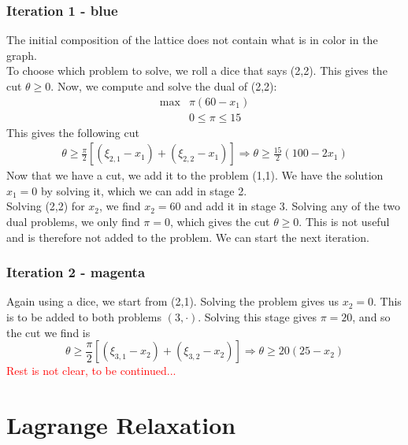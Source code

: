 \documentclass[12pt, openany]{report}
\theoremstyle{definition}
\begin{document}
\subsection{Iteration 1 - blue}
The initial composition of the lattice does not contain what is in color in the graph.\\
To choose which problem to solve, we roll a dice that says (2,2). This gives the cut $\theta\ge 0$. Now, we compute and solve the dual of (2,2):
\begin{equation}
	\begin{aligned}
		\max& \pi(60-x_1)\\
		&0\le \pi \le 15
	\end{aligned}
\end{equation}
This gives the following cut 
\begin{equation}
	\begin{aligned}
		\theta \ge \frac{\pi}{2}[(\xi_{2,1}-x_1)+(\xi_{2,2}-x_1)] \Longrightarrow \theta \ge \frac{15}{2}(100-2x_1)
	\end{aligned}
\end{equation}
Now that we have a cut, we add it to the problem (1,1). We have the solution $x_1=0$ by solving it, which we can add in stage 2. \\
Solving (2,2) for $x_2$, we find $x_2=60$ and add it in stage 3. Solving any of the two dual problems, we only find $\pi =0$, which gives the cut $\theta\ge0$. This is not useful and is therefore not added to the problem. We can start the next iteration.
\subsection{Iteration 2 - magenta}
Again using a dice, we start from (2,1). Solving the problem gives us $x_2=0$. This is to be added to both problems $(3,\cdot)$. Solving this stage gives $\pi=20$, and so the cut we find is 
\begin{equation}
	\theta \ge \frac{\pi}{2} [(\xi_{3,1}-x_2)+(\xi_{3,2}-x_2)]\Rightarrow \theta \ge 20(25-x_2)
\end{equation}
\textcolor{red}{Rest is not clear, to be continued...}
\chapter{Lagrange Relaxation}
\end{document}
